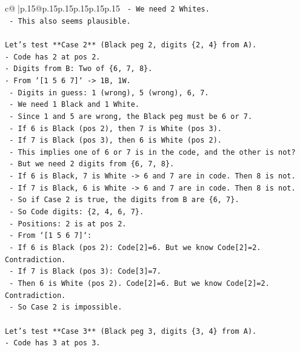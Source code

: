 \documentclass{article}
\begin{document}
{\begin{supertabular}{c@{$\;$}|p{.15\linewidth}@{}p{.15\linewidth}p{.15\linewidth}p{.15\linewidth}p{.15\linewidth}p{.15\linewidth}}
{{{\texttt{        {-} We need 2 Whites.} \\
\texttt{        {-} This also seems plausible.} \\
\\ 
\texttt{Let's test **Case 2** (Black peg 2, digits \{2, 4\} from A).} \\
\texttt{{-} Code has 2 at pos 2.} \\
\texttt{{-} Digits from B: Two of \{6, 7, 8\}.} \\
\texttt{{-} From `{[}1 5 6 7{]}` {-}> 1B, 1W.} \\
\texttt{    {-} Digits in guess: 1 (wrong), 5 (wrong), 6, 7.} \\
\texttt{    {-} We need 1 Black and 1 White.} \\
\texttt{    {-} Since 1 and 5 are wrong, the Black peg must be 6 or 7.} \\
\texttt{    {-} If 6 is Black (pos 2), then 7 is White (pos 3).} \\
\texttt{    {-} If 7 is Black (pos 3), then 6 is White (pos 2).} \\
\texttt{    {-} This implies one of 6 or 7 is in the code, and the other is not?} \\
\texttt{    {-} But we need 2 digits from \{6, 7, 8\}.} \\
\texttt{    {-} If 6 is Black, 7 is White {-}> 6 and 7 are in code. Then 8 is not.} \\
\texttt{    {-} If 7 is Black, 6 is White {-}> 6 and 7 are in code. Then 8 is not.} \\
\texttt{    {-} So if Case 2 is true, the digits from B are \{6, 7\}.} \\
\texttt{    {-} So Code digits: \{2, 4, 6, 7\}.} \\
\texttt{    {-} Positions: 2 is at pos 2.} \\
\texttt{    {-} From `{[}1 5 6 7{]}`:} \\
\texttt{        {-} If 6 is Black (pos 2): Code{[}2{]}=6. But we know Code{[}2{]}=2. Contradiction.} \\
\texttt{        {-} If 7 is Black (pos 3): Code{[}3{]}=7.} \\
\texttt{        {-} Then 6 is White (pos 2). Code{[}2{]}=6. But we know Code{[}2{]}=2. Contradiction.} \\
\texttt{    {-} So Case 2 is impossible.} \\
\\ 
\texttt{Let's test **Case 3** (Black peg 3, digits \{3, 4\} from A).} \\
\texttt{{-} Code has 3 at pos 3.} \\
}}}
\end{supertabular}}
\end{document}
